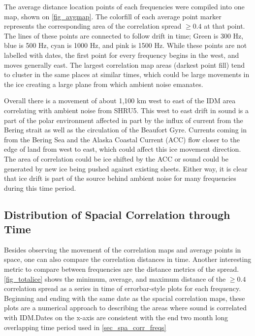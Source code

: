 The average distance location points of each frequencies were compiled into one map, shown on \autoref{fig_avgmap}. The colorfill of each average point marker represents the corresponding area of the correlation spread $\geq 0.4$ at that point. The lines of these points are connected to follow drift in time; Green is 300 Hz, blue is 500 Hz, cyan is 1000 Hz, and pink is 1500 Hz. While these points are not labelled with dates, the first point for every frequency begins in the west, and moves generally east. The largest correlation map areas (darkest point fill) tend to cluster in the same places at similar times, which could be large movements in the ice creating a large plane from which ambient noise emanates.

Overall there is a movement of about 1,100 km west to east of the IDM area correlating with ambient noise from SHRU5. This west to east drift in sound is a part of the polar environment affected in part by the influx of current from the Bering strait as well as the circulation of the Beaufort Gyre. Currents coming in from the Bering Sea and the Alaska Coastal Current (ACC) flow closer to the edge of land from west to east, which could affect this ice movement direction. \parencite{Weingartner2005}  The area of correlation could be ice shifted by the ACC or sound could be generated by new ice being pushed against existing sheets. Either way, it is clear that ice drift is part of the source behind ambient noise for many frequencies during this time period. 




\subsection{Distribution of Spacial Correlation through Time}

Besides observing the movement of the correlation maps and average points in space, one can also compare the correlation distances in time. Another interesting metric to compare between frequencies are the distance metrics of the spread. \autoref{fig_totalice} shows the minimum, average, and maximum distance of the $\geq 0.4$ correlation spread as a series in time of errorbar-style plots for each frequency. Beginning and ending with the same date as the spacial correlation maps, these plots are a numerical approach to describing the areas where sound is correlated with IDM.Dates on the x-axis are consistent with the end two month long overlapping time period used in \autoref{sec_spa_corr_freqs}

